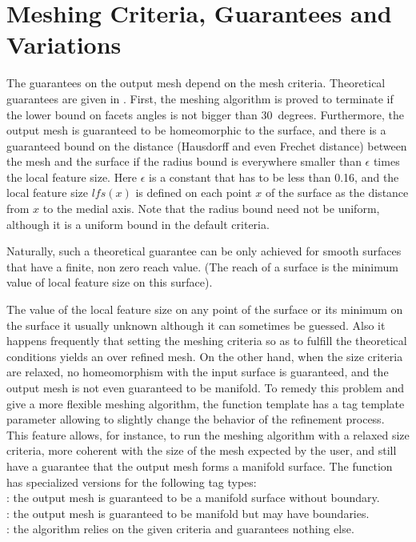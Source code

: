 
\section{Meshing Criteria, Guarantees and Variations\label{SurfaceMesher_section_criteria}}
\label{SurfaceMesher_section_variations}

The guarantees on the output mesh depend on the mesh criteria.
Theoretical guarantees are given in \cite{cgal:bo-pgsms-05}.
First, the meshing algorithm is proved to terminate
if the lower bound on facets angles  is
not bigger than $30$~degrees.
Furthermore, the output mesh
is guaranteed to be homeomorphic to the surface,
and  there is a guaranteed bound
on the  distance (Hausdorff and even Frechet distance)
between the mesh and the surface
if the radius bound is everywhere smaller than
$\epsilon$ times the local feature size.
Here $\epsilon$ is a constant that has to be
less than 0.16, and the local feature size
$lfs(x)$ is defined on each point $x$ of the surface
as the distance from $x$ to the medial axis.
Note that the radius bound need not be uniform,
although it is a uniform bound in the default criteria.

Naturally, such a theoretical guarantee can be only achieved
for smooth surfaces that have a finite, non zero
reach value. (The reach of a surface is the minimum value
of local feature size on
this surface).

The value of the local feature size on any point of the surface
or its minimum on the surface it usually unknown
although it can sometimes be guessed. Also it happens frequently
that setting the meshing criteria so as to fulfill the theoretical
conditions yields an over refined mesh.
On the other hand, when the size criteria are relaxed,
no homeomorphism with the input surface is guaranteed,
and the output mesh is not even guaranteed to be manifold.
To remedy this problem and give a more flexible
meshing algorithm, the function template
 has a tag template parameter
allowing to slightly change the behavior of the refinement process.
This feature allows, for instance,  to run the meshing
algorithm with a relaxed size criteria, more coherent
with the size of the mesh expected by the user,
and still have a guarantee that
the output mesh forms a manifold surface.
The function  has specialized versions
for the following  tag types: \\
: the output mesh is guaranteed to be a manifold
surface without boundary.\\
: the output mesh is guaranteed to be
manifold but may have boundaries.\\
: the algorithm relies on the given criteria and
guarantees nothing else.

